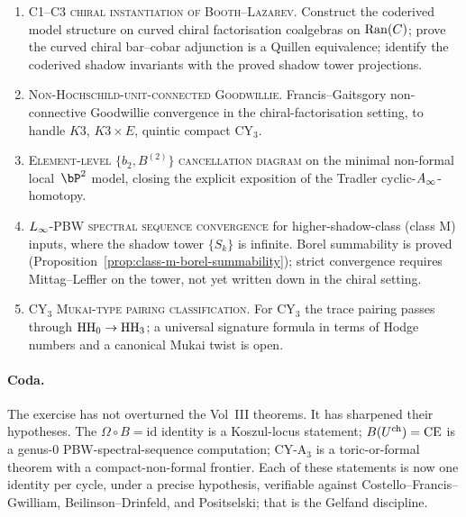 \begin{enumerate}
\item \textsc{C1--C3 chiral instantiation of Booth--Lazarev.}
Construct the coderived model structure on curved chiral
factorisation coalgebras on $\mathrm{Ran}(C)$; prove the curved chiral
bar--cobar adjunction is a Quillen equivalence; identify the
coderived shadow invariants with the proved shadow tower
projections.

\item \textsc{Non-Hochschild-unit-connected Goodwillie.}
Francis--Gaitsgory non-connective Goodwillie convergence in the
chiral-factorisation setting, to handle $K3$, $K3 \times E$,
quintic compact CY$_3$.

\item \textsc{Element-level $\{b_2, B^{(2)}\}$ cancellation
diagram} on the minimal non-formal local~$\bP^2$ model, closing
the explicit exposition of the Tradler cyclic-$A_\infty$-homotopy.

\item \textsc{$L_\infty$-PBW spectral sequence convergence} for
higher-shadow-class (class M) inputs, where the shadow tower
$\{S_k\}$ is infinite. Borel summability is proved
(Proposition~\ref{prop:class-m-borel-summability}); strict
convergence requires Mittag--Leffler on the tower, not yet
written down in the chiral setting.

\item \textsc{CY$_3$ Mukai-type pairing classification.} For
CY$_3$ the trace pairing passes through $\mathrm{HH}_0 \to \mathrm{HH}_3$; a
universal signature formula in terms of Hodge numbers and a
canonical Mukai twist is open.
\end{enumerate}

\paragraph{Coda.} The exercise has not overturned the Vol~III
theorems. It has sharpened their hypotheses.  The
$\Omega \circ B = \mathrm{id}$ identity is a Koszul-locus
statement; $B(U^{\mathrm{ch}}) = \mathrm{CE}$ is a genus-$0$ PBW-spectral-sequence
computation; CY-A$_3$ is a toric-or-formal theorem with a
compact-non-formal frontier. Each of these statements is now
one identity per cycle, under a precise hypothesis, verifiable
against Costello--Francis--Gwilliam, Beilinson--Drinfeld, and
Positselski; that is the Gelfand discipline.

